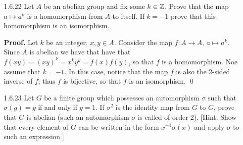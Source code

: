 \begin{enumerate}
      \textbf{Proof.} Let $k$ be a nonzero rational number. Consider the map
      $f : \Q \rightarrow \Q$, $q \mapsto kq$. Let $x, y \in Q$. We have that
      $f(x + y) = k(x + y) = kx + ky = f(x) + f(y)$, so that $f$ is a 
      homomorphism. Now suppose $f(x) = f(y)$, so that $kx = ky$. Since
      $k \neq 0$, we shall multiply the equality $kx = ky$ by $1/k$ to get
      $x = y$; i.e, $f$ is injective. Since $f(x/k) = x$, it follows that $f$ is
      onto, so that $f$ is an automorphism of $\Q$. \qed
   \item[1.6.22]  Let $A$ be an abelian group and fix some $k \in \mathbb{Z}$. Prove
                  that the map $a \mapsto a^k$ is a homomorphism from $A$ to 
                  itself. If $k = -1$ prove that this homomorphism is an
                  isomorphism.

      \textbf{Proof.} Let $k$ be an integer, $x, y \in A$. Consider the map
      $f : A \rightarrow A$, $a \mapsto a^k$. Since $A$ is abelian we have that
      have that $f(xy) = (xy)^k = x^ky^k = f(x)f(y)$, so that $f$ is a 
      homomorphism. Noe assume that $k = -1$. In this case, notice that the
      map $f$ is also the 2-sided inverse of $f$; thus $f$ is bijective, so that $f$ is an isomorphism. \qed
   \item[1.6.23]  Let $G$ be a finite group which possesses an automorphism
                  $\sigma$ such that $\sigma(g) = g$ if and only if $g = 1$. If
                  $\sigma^2$ is the identity map from $G$ to $G$, prove that $G$
                  is abelian (such an automorphism $\sigma$ is called
                   of order 2). [Hint. Show that every
                  element of $G$ can be written in the form $x^{-1}\sigma(x)$
                  and apply $\sigma$ to such an expression.]


\end{enumerate}
